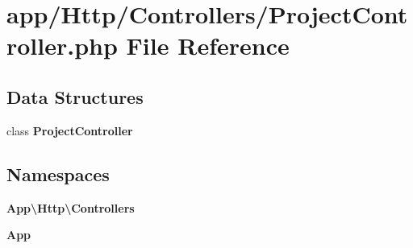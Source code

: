 \section{app/\+Http/\+Controllers/\+Project\+Controller.php File Reference}
\label{_project_controller_8php}
\subsection*{Data Structures}
\begin{DoxyCompactItemize}
\item 
class {\bf Project\+Controller}
\end{DoxyCompactItemize}
\subsection*{Namespaces}
\begin{DoxyCompactItemize}
\item 
 {\bf App\textbackslash{}\+Http\textbackslash{}\+Controllers}
\item 
 {\bf App}
\end{DoxyCompactItemize}

